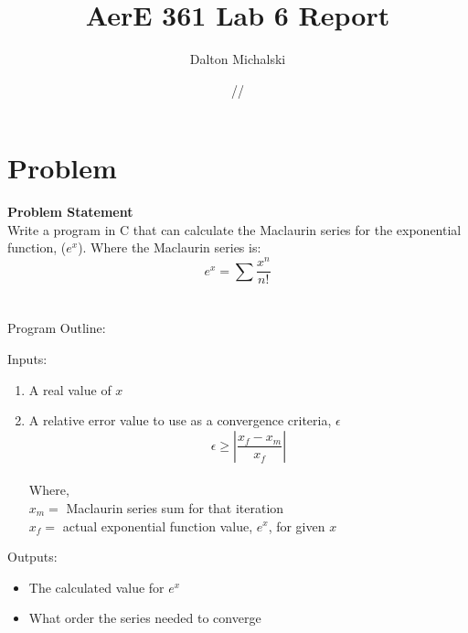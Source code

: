 \documentclass[11pt]{report}
\title{\textbf{AerE 361 Lab 6 Report}}
\author{Dalton Michalski}
\date{\oldstylenums{10}/\oldstylenums{2}/\oldstylenums{2018}}
\begin{document}
\maketitle
 
\section{Problem}
	\textbf{Problem Statement}
    \\Write a program in C that can calculate the Maclaurin series for the exponential function, ($e^x$). Where the Maclaurin series is: \begin{equation}
        e^x = \sum \frac{x^n}{n!}
    \end{equation}
    \\
    \\ Program Outline:
    \begin{outline}
    	\item Inputs: \begin{enumerate}
        \item A real value of $x$
        \item A relative error value to use as a convergence criteria, $\epsilon$
        \begin{equation}
            \epsilon \geq |\frac{x_f - x_m}{x_f}|
        \end{equation}
        \\ Where,
        \\ $x_m =$ Maclaurin series sum for that iteration
        \\ $x_f =$ actual exponential function value, $e^x$, for given $x$
        \end{enumerate}
    	\item Outputs: \begin{itemize}
        \item The calculated value for $e^x$
        \item What order the series needed to converge
        \end{itemize}
	\end{outline}


\newpage
\end{document}
